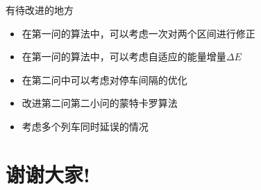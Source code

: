 \documentclass{beamer}
\begin{document}
\begin{frame}{有待改进的地方}
\begin{itemize}
  \item<1-> 在第一问的算法中，可以考虑一次对两个区间进行修正
  \item<2-> 在第一问的算法中，可以考虑自适应的能量增量$\Delta E$
  \item<3-> 在第二问中可以考虑对停车间隔的优化
  \item<4-> 改进第二问第二小问的蒙特卡罗算法
  \item<5-> 考虑多个列车同时延误的情况
\end{itemize}

\end{frame}


\section{谢谢大家!}
\end{document}
